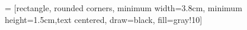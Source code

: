 \usepackage{csquotes}   %
\usepackage{booktabs}   %

\usepackage{ragged2e} %
\usepackage[nottoc]{tocbibind}

\usepackage{blindtext}   %
\usepackage{ifoddpage}




\newcommand{\coloredrulei}[3]{%
  \renewcommand*{\do}[1]{%
    \textcolor{##1}{\rule{#1}{#2}}}
  \begingroup\docsvlist{#3}\endgroup}

\newcommand{\coloredrule}[3]{%
  \setlength{\colortotallength}{#1}
  \renewcommand*{\do}[1]{%
      \stepcounter{colorcounter}}
    \setcounter{colorcounter}{0}
    \docsvlist{#3}
  \setlength{\colorsegmentlength}{%
    \dimexpr \numexpr \colortotallength / \value{colorcounter} \relax sp \relax}
  \coloredrulei{\colorsegmentlength}{#2}{#3}}

 = [rectangle, rounded corners, minimum width=3.8cm, minimum height=1.5cm,text centered, draw=black, fill=gray!10]
